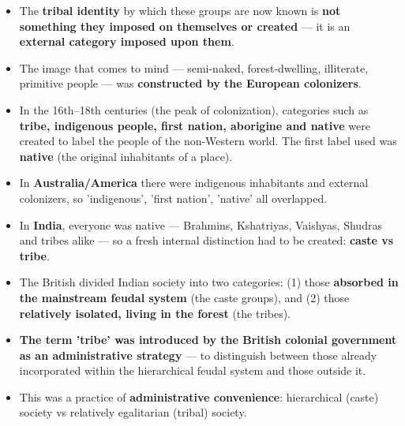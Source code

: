 \begin{KeyConcept}
\begin{itemize}
\item The \textbf{tribal identity} by which these groups are now known is \textbf{not something they imposed on themselves or created} --- it is an \textbf{external category imposed upon them}.
\item The image that comes to mind --- semi-naked, forest-dwelling, illiterate, primitive people --- was \textbf{constructed by the European colonizers}.
\item In the 16th--18th centuries (the peak of colonization), categories such as \textbf{tribe, indigenous people, first nation, aborigine and native} were created to label the people of the non-Western world. The first label used was \textbf{native} (the original inhabitants of a place).
\end{itemize}
\end{KeyConcept}

\begin{ComparisonBox}
\begin{itemize}
\item In \textbf{Australia/America} there were indigenous inhabitants and external colonizers, so 'indigenous', 'first nation', 'native' all overlapped.
\item In \textbf{India}, everyone was native --- Brahmins, Kshatriyas, Vaishyas, Shudras and tribes alike --- so a fresh internal distinction had to be created: \textbf{caste vs tribe}.
\item The British divided Indian society into two categories: (1) those \textbf{absorbed in the mainstream feudal system} (the caste groups), and (2) those \textbf{relatively isolated, living in the forest} (the tribes).
\end{itemize}
\end{ComparisonBox}

\begin{KeyConcept}
\begin{itemize}
\item \textbf{The term 'tribe' was introduced by the British colonial government as an administrative strategy} --- to distinguish between those already incorporated within the hierarchical feudal system and those outside it.
\item This was a practice of \textbf{administrative convenience}: hierarchical (caste) society vs relatively egalitarian (tribal) society.
\end{itemize}
\end{KeyConcept}

